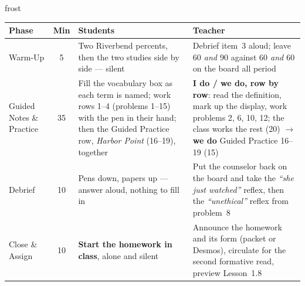 \documentclass[10pt]{article}
\begin{document}
\begin{fixedskillbox}{frost}
\renewcommand{\arraystretch}{1.25}
\begin{tabularx}{\linewidth}{@{}l c X X@{}}
\textbf{Phase} & \textbf{Min} & \textbf{Students} & \textbf{Teacher} \\
\hline
Warm-Up & 5 & Two Riverbend percents, then the two studies side by side --- silent & Debrief
  item~3 aloud; leave \emph{$60$ and $90$} against \emph{$60$ and $60$} on the board all
  period \\
Guided Notes \& Practice & 35 & Fill the vocabulary box as each term is named; work rows 1--4
  (problems 1--15) with the pen in their hand; then the Guided Practice row, \emph{Harbor
  Point} (16--19), together & \textbf{I do / we do, row by row}: read the definition, mark up
  the display, work problems 2, 6, 10, 12; the class works the rest (20) $\to$ \textbf{we do}
  Guided Practice 16--19 (15) \\
Debrief & 10 & Pens down, papers up --- answer aloud, nothing to fill in & Put the counselor
  back on the board and take the \emph{``she just watched''} reflex, then the
  \emph{``unethical''} reflex from problem~8 \\
Close \& Assign & 10 & \textbf{Start the homework in class}, alone and silent & Announce the
  homework and its form (packet or Desmos), circulate for the second formative read, preview
  Lesson~1.8 \\
\end{tabularx}
\end{fixedskillbox}
\end{document}
